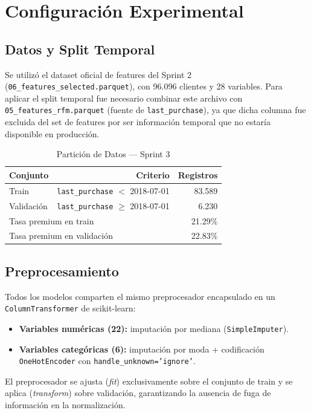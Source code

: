 \documentclass[journal,letterpaper]{IEEEtran}
\begin{document}
\section{Configuración Experimental}

\subsection{Datos y Split Temporal}
Se utilizó el dataset oficial de features del Sprint 2 (\texttt{06\_features\_selected.parquet}), con 96.096 clientes y 28 variables. Para aplicar el split temporal fue necesario combinar este archivo con \texttt{05\_features\_rfm.parquet} (fuente de \texttt{last\_purchase}), ya que dicha columna fue excluida del set de features por ser información temporal que no estaría disponible en producción.

\begin{table}[h]
\centering
\caption{Partición de Datos — Sprint 3}
\label{tab:split}
\begin{tabular}{lrr}
\toprule
Conjunto & Criterio & Registros \\
\midrule
Train & \texttt{last\_purchase} $<$ 2018-07-01 & 83.589 \\
Validación & \texttt{last\_purchase} $\geq$ 2018-07-01 & 6.230 \\
\midrule
\multicolumn{2}{l}{Tasa premium en train} & 21.29\% \\
\multicolumn{2}{l}{Tasa premium en validación} & 22.83\% \\
\bottomrule
\end{tabular}
\end{table}

\subsection{Preprocesamiento}
Todos los modelos comparten el mismo preprocesador encapsulado en un \texttt{ColumnTransformer} de scikit-learn:
\begin{itemize}
    \item \textbf{Variables numéricas (22):} imputación por mediana (\texttt{SimpleImputer}).
    \item \textbf{Variables categóricas (6):} imputación por moda + codificación \texttt{OneHotEncoder} con \texttt{handle\_unknown='ignore'}.
\end{itemize}

El preprocesador se ajusta (\textit{fit}) exclusivamente sobre el conjunto de train y se aplica (\textit{transform}) sobre validación, garantizando la ausencia de fuga de información en la normalización.
\end{document}
